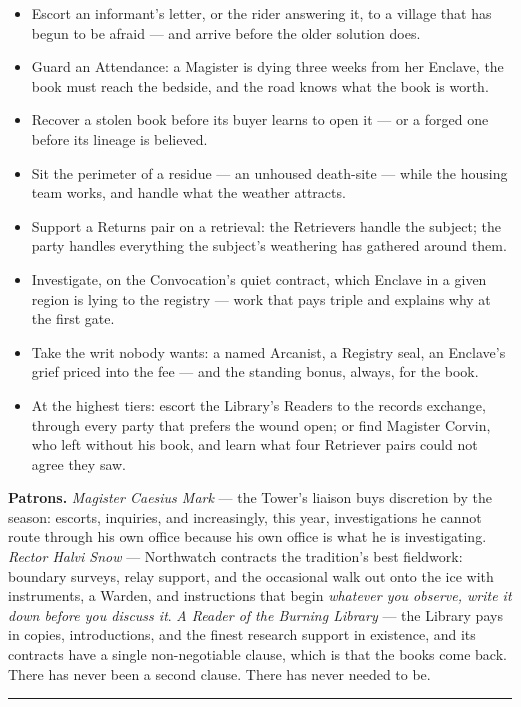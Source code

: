 \begin{itemize}
    \item Escort an informant's letter, or the rider answering it, to a village that has begun to be afraid --- and arrive before the older solution does.
    \item Guard an Attendance: a Magister is dying three weeks from her Enclave, the book must reach the bedside, and the road knows what the book is worth.
    \item Recover a stolen book before its buyer learns to open it --- or a forged one before its lineage is believed.
    \item Sit the perimeter of a residue --- an unhoused death-site --- while the housing team works, and handle what the weather attracts.
    \item Support a Returns pair on a retrieval: the Retrievers handle the subject; the party handles everything the subject's weathering has gathered around them.
    \item Investigate, on the Convocation's quiet contract, which Enclave in a given region is lying to the registry --- work that pays triple and explains why at the first gate.
    \item Take the writ nobody wants: a named Arcanist, a Registry seal, an Enclave's grief priced into the fee --- and the standing bonus, always, for the book.
    \item At the highest tiers: escort the Library's Readers to the records exchange, through every party that prefers the wound open; or find Magister Corvin, who left without his book, and learn what four Retriever pairs could not agree they saw.
\end{itemize}

\textbf{Patrons.} \textit{Magister Caesius Mark} --- the Tower's liaison buys discretion by the season: escorts, inquiries, and increasingly, this year, investigations he cannot route through his own office because his own office is what he is investigating. \textit{Rector Halvi Snow} --- Northwatch contracts the tradition's best fieldwork: boundary surveys, relay support, and the occasional walk out onto the ice with instruments, a Warden, and instructions that begin \textit{whatever you observe, write it down before you discuss it}. \textit{A Reader of the Burning Library} --- the Library pays in copies, introductions, and the finest research support in existence, and its contracts have a single non-negotiable clause, which is that the books come back. There has never been a second clause. There has never needed to be.

\medskip\hrule\medskip
